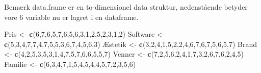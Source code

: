 \documentclass[]{book}
\newenvironment{Shaded}{\begin{snugshade}}{\end{snugshade}}
\newcommand{\DecValTok}[1]{\textcolor[rgb]{0.00,0.00,0.81}{#1}}
\newcommand{\KeywordTok}[1]{\textcolor[rgb]{0.13,0.29,0.53}{\textbf{#1}}}
\newcommand{\NormalTok}[1]{#1}
\newcommand{\StringTok}[1]{\textcolor[rgb]{0.31,0.60,0.02}{#1}}
\begin{document}
Bemærk data.frame er en to-dimensionel data struktur, nedenstående betyder vore 6 variable nu er lagret i en dataframe.

\begin{Shaded}
\begin{Highlighting}[]
\NormalTok{Pris <-}\StringTok{ }\KeywordTok{c}\NormalTok{(}\DecValTok{6}\NormalTok{,}\DecValTok{7}\NormalTok{,}\DecValTok{6}\NormalTok{,}\DecValTok{5}\NormalTok{,}\DecValTok{7}\NormalTok{,}\DecValTok{6}\NormalTok{,}\DecValTok{5}\NormalTok{,}\DecValTok{6}\NormalTok{,}\DecValTok{3}\NormalTok{,}\DecValTok{1}\NormalTok{,}\DecValTok{2}\NormalTok{,}\DecValTok{5}\NormalTok{,}\DecValTok{2}\NormalTok{,}\DecValTok{3}\NormalTok{,}\DecValTok{1}\NormalTok{,}\DecValTok{2}\NormalTok{)}
\NormalTok{Software <-}\StringTok{ }\KeywordTok{c}\NormalTok{(}\DecValTok{5}\NormalTok{,}\DecValTok{3}\NormalTok{,}\DecValTok{4}\NormalTok{,}\DecValTok{7}\NormalTok{,}\DecValTok{7}\NormalTok{,}\DecValTok{4}\NormalTok{,}\DecValTok{7}\NormalTok{,}\DecValTok{5}\NormalTok{,}\DecValTok{5}\NormalTok{,}\DecValTok{3}\NormalTok{,}\DecValTok{6}\NormalTok{,}\DecValTok{7}\NormalTok{,}\DecValTok{4}\NormalTok{,}\DecValTok{5}\NormalTok{,}\DecValTok{6}\NormalTok{,}\DecValTok{3}\NormalTok{)}
\NormalTok{Æstetik <-}\StringTok{ }\KeywordTok{c}\NormalTok{(}\DecValTok{3}\NormalTok{,}\DecValTok{2}\NormalTok{,}\DecValTok{4}\NormalTok{,}\DecValTok{1}\NormalTok{,}\DecValTok{5}\NormalTok{,}\DecValTok{2}\NormalTok{,}\DecValTok{2}\NormalTok{,}\DecValTok{4}\NormalTok{,}\DecValTok{6}\NormalTok{,}\DecValTok{7}\NormalTok{,}\DecValTok{6}\NormalTok{,}\DecValTok{7}\NormalTok{,}\DecValTok{5}\NormalTok{,}\DecValTok{6}\NormalTok{,}\DecValTok{5}\NormalTok{,}\DecValTok{7}\NormalTok{)}
\NormalTok{Brand <-}\StringTok{ }\KeywordTok{c}\NormalTok{(}\DecValTok{4}\NormalTok{,}\DecValTok{2}\NormalTok{,}\DecValTok{5}\NormalTok{,}\DecValTok{3}\NormalTok{,}\DecValTok{5}\NormalTok{,}\DecValTok{3}\NormalTok{,}\DecValTok{1}\NormalTok{,}\DecValTok{4}\NormalTok{,}\DecValTok{7}\NormalTok{,}\DecValTok{5}\NormalTok{,}\DecValTok{7}\NormalTok{,}\DecValTok{6}\NormalTok{,}\DecValTok{6}\NormalTok{,}\DecValTok{5}\NormalTok{,}\DecValTok{5}\NormalTok{,}\DecValTok{7}\NormalTok{)}
\NormalTok{Venner <-}\StringTok{ }\KeywordTok{c}\NormalTok{(}\DecValTok{7}\NormalTok{,}\DecValTok{2}\NormalTok{,}\DecValTok{5}\NormalTok{,}\DecValTok{6}\NormalTok{,}\DecValTok{2}\NormalTok{,}\DecValTok{4}\NormalTok{,}\DecValTok{1}\NormalTok{,}\DecValTok{7}\NormalTok{,}\DecValTok{3}\NormalTok{,}\DecValTok{2}\NormalTok{,}\DecValTok{6}\NormalTok{,}\DecValTok{7}\NormalTok{,}\DecValTok{6}\NormalTok{,}\DecValTok{2}\NormalTok{,}\DecValTok{4}\NormalTok{,}\DecValTok{5}\NormalTok{)}
\NormalTok{Familie <-}\StringTok{ }\KeywordTok{c}\NormalTok{(}\DecValTok{6}\NormalTok{,}\DecValTok{3}\NormalTok{,}\DecValTok{4}\NormalTok{,}\DecValTok{7}\NormalTok{,}\DecValTok{1}\NormalTok{,}\DecValTok{5}\NormalTok{,}\DecValTok{4}\NormalTok{,}\DecValTok{5}\NormalTok{,}\DecValTok{4}\NormalTok{,}\DecValTok{4}\NormalTok{,}\DecValTok{5}\NormalTok{,}\DecValTok{7}\NormalTok{,}\DecValTok{2}\NormalTok{,}\DecValTok{3}\NormalTok{,}\DecValTok{5}\NormalTok{,}\DecValTok{6}\NormalTok{)}


\end{Highlighting}
\end{Shaded}
\end{document}
